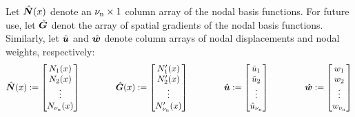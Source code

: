 \renewcommand{\gradNBFa}{\Array{G}}
Let $\hat{\bm{N}}(x)$ denote an 
${\nu_\text{n}}\times1$ column array of the nodal basis functions. For future use, let $\gradNBFa$ denot the array of spatial gradients of the nodal basis functions. Similarly, 
let $\hat{\bm{u}}$ and $\hat{\bm{w}}$ denote \numnodes{} column arrays of nodal displacements and nodal weights, respectively:
\begin{equation}
  \NBFa(x)\definedEqual\begin{bmatrix}\NBF_1(x)\\ \NBF_2(x) \\ \vdots \\ \NBF_\numnodes(x)\end{bmatrix}
\qquad\qquad
  \gradNBFa(x)\definedEqual\begin{bmatrix}\NBF_1'(x)\\ \NBF_2'(x) \\ \vdots \\ \NBF_\numnodes'(x)\end{bmatrix}
\qquad\qquad
  \Array{u}\definedEqual\begin{bmatrix} \aprx{u}_1\\ \aprx{u}_2 \\ \vdots \\ \aprx{u}_\numnodes\end{bmatrix}
\qquad\qquad
  \Array{w}\definedEqual\begin{bmatrix}w_1\\ w_2 \\ \vdots \\ w_\numnodes\end{bmatrix}
\end{equation}

